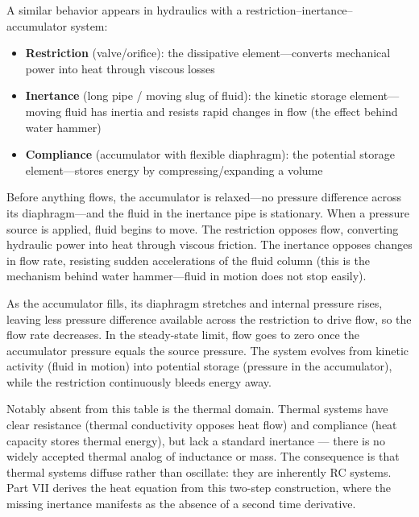 \documentclass[
  letterpaper,
  DIV=11,
  numbers=noendperiod]{scrartcl}
\providecommand{\tightlist}{%
  \setlength{\itemsep}{0pt}\setlength{\parskip}{0pt}}
\begin{document}
A similar behavior appears in hydraulics with a
restriction--inertance--accumulator system:

\begin{itemize}
\tightlist
\item
  \textbf{Restriction} (valve/orifice): the dissipative
  element---converts mechanical power into heat through viscous losses
\item
  \textbf{Inertance} (long pipe / moving slug of fluid): the kinetic
  storage element---moving fluid has inertia and resists rapid changes
  in flow (the effect behind water hammer)
\item
  \textbf{Compliance} (accumulator with flexible diaphragm): the
  potential storage element---stores energy by compressing/expanding a
  volume
\end{itemize}

Before anything flows, the accumulator is relaxed---no pressure
difference across its diaphragm---and the fluid in the inertance pipe is
stationary. When a pressure source is applied, fluid begins to move. The
restriction opposes flow, converting hydraulic power into heat through
viscous friction. The inertance opposes changes in flow rate, resisting
sudden accelerations of the fluid column (this is the mechanism behind
water hammer---fluid in motion does not stop easily).

As the accumulator fills, its diaphragm stretches and internal pressure
rises, leaving less pressure difference available across the restriction
to drive flow, so the flow rate decreases. In the steady-state limit,
flow goes to zero once the accumulator pressure equals the source
pressure. The system evolves from kinetic activity (fluid in motion)
into potential storage (pressure in the accumulator), while the
restriction continuously bleeds energy away.

Notably absent from this table is the thermal domain. Thermal systems
have clear resistance (thermal conductivity opposes heat flow) and
compliance (heat capacity stores thermal energy), but lack a standard
inertance --- there is no widely accepted thermal analog of inductance
or mass. The consequence is that thermal systems diffuse rather than
oscillate: they are inherently RC systems. Part VII derives the heat
equation from this two-step construction, where the missing inertance
manifests as the absence of a second time derivative.
\end{document}
